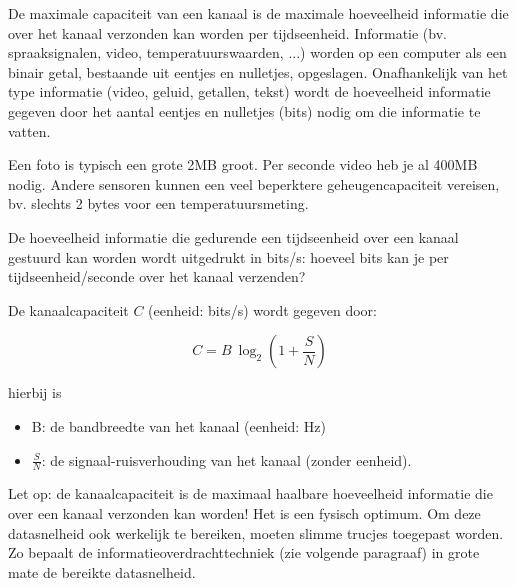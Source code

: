 De maximale capaciteit van een kanaal is de maximale hoeveelheid informatie die over het kanaal verzonden kan worden per tijdseenheid. Informatie (bv. spraaksignalen, video, temperatuurswaarden, ...) worden op een computer als een binair getal, bestaande uit eentjes en nulletjes, opgeslagen. Onafhankelijk van het type informatie (video, geluid, getallen, tekst) wordt de hoeveelheid informatie gegeven door het aantal eentjes en nulletjes (bits) nodig om die informatie te vatten. 

Een foto is typisch een grote 2MB groot. Per seconde video heb je al 400MB nodig. Andere sensoren kunnen een veel beperktere geheugencapaciteit vereisen, bv. slechts 2 bytes voor een temperatuursmeting.

De hoeveelheid informatie die gedurende een tijdseenheid over een kanaal gestuurd kan worden wordt uitgedrukt in bits/s: hoeveel bits kan je per tijdseenheid/seconde over het kanaal verzenden?

De kanaalcapaciteit $C$ (eenheid: bits/s) wordt gegeven door:

\begin{equation*}
    C = B ~ \log_2 (1+\frac{S}{N})
\end{equation*}

hierbij is 
\begin{itemize}
    \item B: de bandbreedte van het kanaal (eenheid: Hz)
    \item $\frac{S}{N}$: de signaal-ruisverhouding van het kanaal (zonder eenheid).
\end{itemize}

Let op: de kanaalcapaciteit is de maximaal haalbare hoeveelheid informatie die over een kanaal verzonden kan worden! Het is een fysisch optimum. Om deze datasnelheid ook werkelijk te bereiken, moeten slimme trucjes toegepast worden. Zo bepaalt de informatieoverdrachttechniek (zie volgende paragraaf) in grote mate de bereikte datasnelheid.

